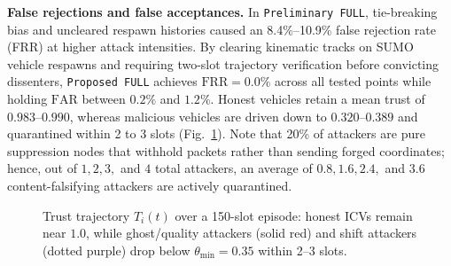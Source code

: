\documentclass[conference]{IEEEtran}
\begin{document}
\textbf{False rejections and false acceptances.} In \texttt{Preliminary FULL}, tie-breaking bias and uncleared respawn histories caused an 8.4\%--10.9\% false rejection rate (FRR) at higher attack intensities. By clearing kinematic tracks on SUMO vehicle respawns and requiring two-slot trajectory verification before convicting dissenters, \texttt{Proposed FULL} achieves $\mathrm{FRR}=0.0\%$ across all tested points while holding $\mathrm{FAR}$ between $0.2\%$ and $1.2\%$. Honest vehicles retain a mean trust of $0.983$--$0.990$, whereas malicious vehicles are driven down to $0.320$--$0.389$ and quarantined within 2 to 3 slots (Fig.~\ref{fig:trust}). Note that 20\% of attackers are pure suppression nodes that withhold packets rather than sending forged coordinates; hence, out of $1, 2, 3,$ and $4$ total attackers, an average of $0.8, 1.6, 2.4,$ and $3.6$ content-falsifying attackers are actively quarantined.

\begin{figure}[t]
\centering
{}
\caption{Trust trajectory $T_i(t)$ over a 150-slot episode: honest ICVs remain near $1.0$, while ghost/quality attackers (solid red) and shift attackers (dotted purple) drop below $\theta_{\min}=0.35$ within 2--3 slots.}
\label{fig:trust}
\end{figure}
\end{document}
